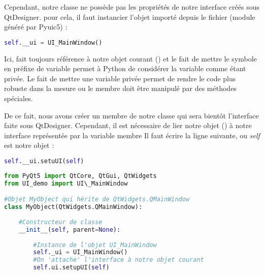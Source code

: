 {Cependant, notre classe  ne possède pas les propriétés de notre interface créés sous QtDesigner. pour cela, il faut instancier l'objet importé depuis le fichier  (module généré par Pyuic5) : 

\begin{lstlisting}[language=Python]
        self.__ui = UI_MainWindow()
\end{lstlisting}

Ici,  fait toujours référence à notre objet courant () et le fait de mettre le symbole \bold{\_\_} en préfixe de variable permet à Python de considérer la variable comme étant privée. \newline 
Le fait de mettre une variable privée permet de rendre le code plus robuste dans la mesure ou le membre doit être manipulé par des méthodes spéciales.\newline


De ce fait, nous avons créer un membre de notre classe qui sera bientôt l'interface faite sous QtDesigner. \newline
Cependant, il est nécessaire de lier notre objet () à notre interface représentée par la variable membre  \newline
Il faut écrire la ligne suivante, ou \textit{self} est notre objet  : 

\begin{lstlisting}[language=Python]
        self.__ui.setuUI(self)
\end{lstlisting}




\begin{lstlisting}[language=Python]
from PyQt5 import QtCore, QtGui, QtWidgets
from UI_demo import UI\_MainWindow

#Objet MyObject qui hérite de QtWidgets.QMainWindow
class MyObject(QtWidgets.QMainWindow):
    
    #Constructeur de classe
    __init__(self, parent=None):
        
        #Instance de l'objet UI_MainWindow
        self._ui = UI_MainWindow()
        #On 'attache' l'interface à notre objet courant
        self.ui.setupUI(self)

\end{lstlisting}



}

